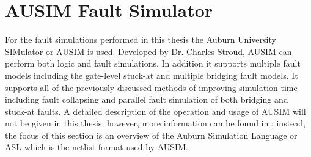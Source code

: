 \documentclass[12pt]{report}
\begin{document}
\section{AUSIM Fault Simulator}
For the fault simulations performed in this thesis the Auburn University SIMulator or AUSIM is used.  Developed by Dr. Charles Stroud\cite{ausim}\cite{asl}, AUSIM can perform both logic and fault simulations.  In addition it supports multiple fault models including the gate-level stuck-at and multiple bridging fault models\cite{ausim}.  It supports all of the previously discussed methods of improving simulation time including fault collapsing and parallel fault simulation of both bridging and stuck-at faults\cite{ausim}.  A detailed description of the operation and usage of AUSIM will not be given in this thesis; however, more information can be found in \cite{ausim}\cite{asl}; instead, the focus of this section is an overview of the Auburn Simulation Language or ASL which is the netlist format used by AUSIM.
\end{document}
